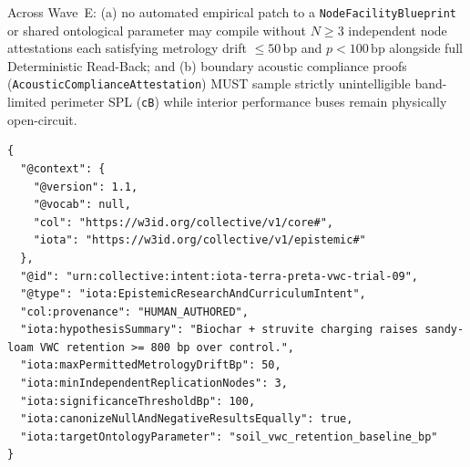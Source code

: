 \begin{invariant}
\label{inv:wave-e-epistemic-cultural}
Across Wave~E: (a) no automated empirical patch to a \texttt{NodeFacilityBlueprint} or shared ontological parameter may compile without $N \ge 3$ independent node attestations each satisfying metrology drift $\le 50\,\mathrm{bp}$ and $p < 100\,\mathrm{bp}$ alongside full Deterministic Read-Back; and (b) boundary acoustic compliance proofs (\texttt{AcousticComplianceAttestation}) MUST sample strictly unintelligible band-limited perimeter SPL (\texttt{cB}) while interior performance buses remain physically open-circuit.
\end{invariant}

\begin{lstlisting}[language=jsonld,caption={Canonical Wave E \texttt{EpistemicResearchAndCurriculumIntent} enforcing $\le 50\,\mathrm{bp}$ metrology drift, $N \ge 3$ multi-node replication, and negative-result parity.}]
{
  "@context": {
    "@version": 1.1,
    "@vocab": null,
    "col": "https://w3id.org/collective/v1/core#",
    "iota": "https://w3id.org/collective/v1/epistemic#"
  },
  "@id": "urn:collective:intent:iota-terra-preta-vwc-trial-09",
  "@type": "iota:EpistemicResearchAndCurriculumIntent",
  "col:provenance": "HUMAN_AUTHORED",
  "iota:hypothesisSummary": "Biochar + struvite charging raises sandy-loam VWC retention >= 800 bp over control.",
  "iota:maxPermittedMetrologyDriftBp": 50,
  "iota:minIndependentReplicationNodes": 3,
  "iota:significanceThresholdBp": 100,
  "iota:canonizeNullAndNegativeResultsEqually": true,
  "iota:targetOntologyParameter": "soil_vwc_retention_baseline_bp"
}
\end{lstlisting}

